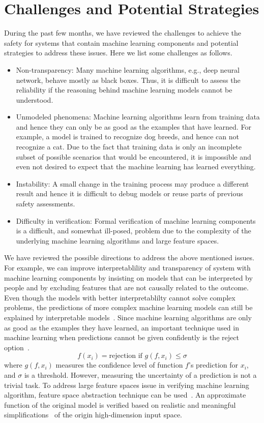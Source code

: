 \documentclass[11pt,onecolumn]{IEEEtran}
\begin{document}
\section{Challenges and Potential Strategies}
During the past few months, we have reviewed the challenges to achieve the safety  for  systems that contain machine learning components  and  potential strategies to address these issues. Here we list some challenges as follows. 
\begin{itemize}
  \item  Non-transparency: Many machine learning algorithms, e.g., deep neural network, behave mostly as black boxes. Thus,  it is difficult to assess the reliability if the reasoning behind  machine learning models cannot be understood.
  \item Unmodeled phenomena: Machine learning algorithms learn from training data and hence they can only be as good as the examples that have learned.  For example, a model is trained to recognize dog breeds, and hence can not recognize a cat. Due to the fact that training data is only an incomplete  subset of possible scenarios that would be encountered,  it is impossible and even not desired to expect that the machine learning has learned everything.

  \item Instability:  A small change in the training process may produce a different result and hence it is difficult to debug models or reuse parts of previous safety assessments. 
  \item Difficulty in verification: Formal verification of machine learning components is a difficult, and somewhat ill-posed, problem due to the complexity of the underlying machine learning algorithms and large feature spaces.
\end{itemize}
We have reviewed the possible directions to address the above mentioned issues. For example, we can improve interpretablility and transparency of system with machine learning components by insisting on models that can be interpreted by people and by excluding features that are not causally related to the outcome. Even though the models with better interpretablilty cannot solve complex problems, the predictions of more complex machine learning models can still be explained by interpretable models~\cite{lime}.   Since machine learning  algorithms are only as good as the examples they have learned, an important technique used in machine learning when predictions cannot be given confidently is the  reject option~\cite{reject}.
\[
f(x_i)=\mbox{rejection if }g(f,x_i)\leq \sigma
\]
where $g(f,x_i)$ measures the confidence level of  function $f$'s  prediction for  $x_i$, and $\sigma$ is a threshold. However, measuring the uncertainty of a prediction is not a trivial task. To address large feature spaces issue in verifying machine learning algorithm,  feature space abstraction technique can be used~\cite{abstract}.  An approximate function  of the original model  is verified based on realistic and meaningful simplifications~\cite{abstract} of the origin high-dimension input space. 
\end{document}
